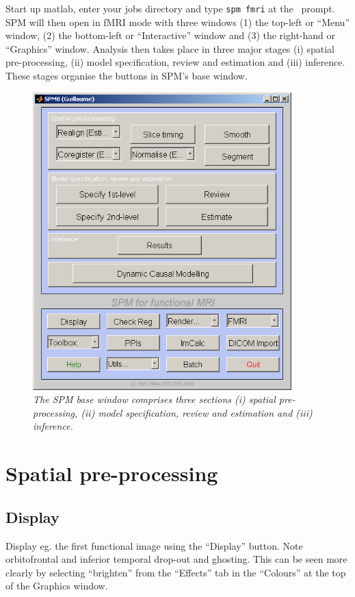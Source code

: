 Start up matlab, enter your jobs directory and type \texttt{spm fmri} at the \matlab\ prompt. SPM will then open in fMRI mode with three windows (1) the top-left or ``Menu'' window, (2) the bottom-left or ``Interactive'' window and (3) the right-hand or ``Graphics'' window. 
Analysis then takes place in three major stages (i) spatial pre-processing, (ii) model specification, review and estimation and (iii) inference. These stages organise the buttons in SPM's base window.
\begin{figure}
\begin{center}
\includegraphics[width=100mm]{faces/command}
\caption{\em The SPM base window comprises three sections (i) spatial pre-processing, (ii) model specification, review and estimation and (iii) inference. \label{command}}
\end{center}
\end{figure}

\section{Spatial pre-processing}

\subsection{Display}

Display eg. the first functional image using the ``Display'' button. Note orbitofrontal and inferior temporal drop-out and ghosting. This can be seen more clearly by selecting ``brighten'' from the ``Effects'' tab in the ``Colours'' at the top of the Graphics window.


